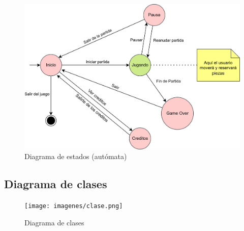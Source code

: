 \documentclass{article}
\begin{document}
\begin{figure}[H]
        \includegraphics[width=\textwidth]{imagenes/estados.png}
        \caption{Diagrama de estados (autómata)}
\end{figure}

\subsection{Diagrama de clases}
\begin{figure}[H]
        \texttt{[image: imagenes/clase.png]}
        \caption{Diagrama de clases}
\end{figure}
\end{document}
